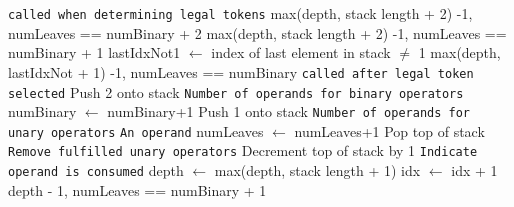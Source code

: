 \documentclass[12pt]{iopart}
\begin{document}
\begin{algorithm}
\begin{algorithmic}[1]
     \Comment\texttt{{called when determining legal tokens}}
            \State \Return max(depth, stack length + 2) -1,  numLeaves == numBinary + 2
            \State \Return max(depth, stack length + 2) -1,  numLeaves == numBinary + 1
            \State lastIdxNot1 $\gets$ index of last element in stack $\neq$ 1
            \State \Return max(depth, lastIdxNot + 1) -1,  numLeaves == numBinary
        \EndIf
    \Else \Comment\texttt{{called after legal token selected}}
            \State Push 2 onto stack   \Comment\texttt{{Number of operands for binary operators}}
            \State numBinary $\gets$ numBinary+1
             \State Push 1 onto stack  \Comment\texttt{{Number of operands for unary operators}}
        \Else  \Comment\texttt{{An operand}}
            \State numLeaves $\gets$ numLeaves+1
                \State Pop top of stack \Comment\texttt{{Remove fulfilled unary operators}}
            \EndWhile
                \State Decrement top of stack by 1 \Comment\texttt{{Indicate operand is consumed}}
            \EndIf
        \EndIf
        \State  depth $\gets$ max(depth, stack length + 1)
        \State idx $\gets$ idx + 1
    \EndIf
    \State \Return depth - 1, numLeaves == numBinary + 1 
\EndFunction
\end{algorithmic}
\end{algorithm}
\end{document}
